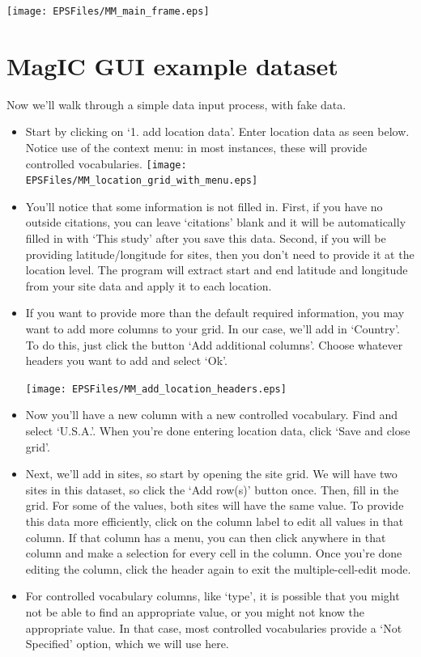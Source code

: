 \documentclass[11pt]{book}
\begin{document}
{{  \texttt{[image: EPSFiles/MM\_main\_frame.eps]}

\section{MagIC GUI example dataset}
Now we'll walk through a simple data input process, with fake data.
  \begin{itemize}
  \item Start by clicking on `1. add location data'.  Enter location data as seen below. Notice use of the context menu: in most instances, these will provide controlled vocabularies.
    \texttt{[image: EPSFiles/MM\_location\_grid\_with\_menu.eps]}
  \item You'll notice that some information is not filled in.  First, if you have no outside citations, you can leave `citations' blank and it will be automatically filled in with `This study' after you save this data.  Second, if you will be providing latitude/longitude for sites, then you don't need to provide it at the location level.  The program will extract start and end latitude and longitude from your site data and apply it to each location.
  \item If you want to provide more than the default required information, you may want to add more columns to your grid.  In our case, we'll add in `Country'.  To do this, just click the button `Add additional columns'.  Choose whatever headers you want to add and select `Ok'.

    \texttt{[image: EPSFiles/MM\_add\_location\_headers.eps]}

  \item Now you'll have a new column with a new controlled vocabulary.  Find and select `U.S.A.'.  When you're done entering location data, click `Save and close grid'.

  \item Next, we'll add in sites, so start by opening the site grid.  We will have two sites in this dataset, so click the `Add row(s)' button once.  Then, fill in the grid.  For some of the values, both sites will have the same value.  To provide this data more efficiently, click on the column label to edit all values in that column.  If that column has a menu, you can then click anywhere in that column and make a selection for every cell in the column. Once you're done editing the column, click the header again to exit the multiple-cell-edit mode.
  \item For controlled vocabulary columns, like `type', it is possible that you might not be able to find an appropriate value, or you might not know the appropriate value.  In that case, most controlled vocabularies provide a `Not Specified' option, which we will use here.


\end{itemize}}}
\end{document}
